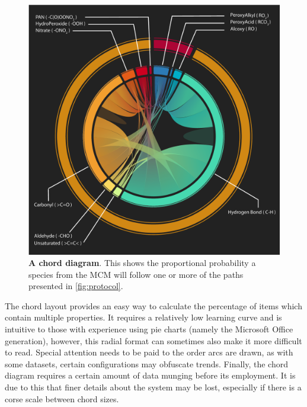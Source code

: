 \begin{figure}[H]
     \centering
     \includegraphics[width=\textwidth]{figures_c1/radicallayermcmgen.pdf}
        \caption{\textbf{A chord diagram}. This shows the proportional probability a species from the MCM will follow one or more of the paths presented in \autoref{fig:protocol}.}
        \label{fig:chord}
\end{figure}


The chord layout provides an easy way to calculate the percentage of items which contain multiple properties. It requires a relatively low learning curve and is intuitive to those with experience using pie charts (namely the Microsoft Office generation), however, this radial format can sometimes also make it more difficult to read. Special attention needs to be paid to the order arcs are drawn, as with some datasets, certain configurations may obfuscate trends. Finally, the chord diagram requires a certain amount of data munging before its employment. It is due to this that finer details about the system may be lost, especially if there is a corse scale between chord sizes.










